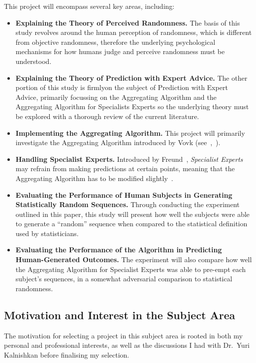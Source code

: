 This project will encompass several key areas, including:
\begin{itemize}
    \item \textbf{Explaining the Theory of Perceived Randomness.} The basis of this study revolves around the human perception of randomness, which is different from objective randomness, therefore the underlying psychological mechanisms for how humans judge and perceive randomness must be understood.
    \item \textbf{Explaining the Theory of Prediction with Expert Advice.} The other portion of this study is firmlyon the subject of Prediction with Expert Advice, primarily focussing on the Aggregating Algorithm and the Aggregating Algorithm for Specialists Experts so the underlying theory must be explored with a thorough review of the current literature.
    \item \textbf{Implementing the Aggregating Algorithm.} This project will primarily investigate the Aggregating Algorithm introduced by Vovk (see~\cite{vovk:1990},\ \cite{vovk:1998}).
    \item \textbf{Handling Specialist Experts.} Introduced by Freund~\cite{freund:1997}, \textit{Specialist Experts} may refrain from making predictions at certain points, meaning that the Aggregating Algorithm has to be modified slightly~\cite{kalnishkan:2015}.
    \item \textbf{Evaluating the Performance of Human Subjects in Generating Statistically Random Sequences.} Through conducting the experiment outlined in this paper, this study will present how well the subjects were able to generate a ``random'' sequence when compared to the statistical definition used by statisticians.
    \item \textbf{Evaluating the Performance of the Algorithm in Predicting Human-Generated Outcomes.} The experiment will also compare how well the Aggregating Algorithm for Specialist Experts was able to pre-empt each subject's sequences, in a somewhat adversarial comparison to statistical randomness.
\end{itemize}

\subsection{Motivation and Interest in the Subject Area}
The motivation for selecting a project in this subject area is rooted in both my personal and professional interests, as well as the discussions I had with Dr.\ Yuri Kalnishkan before finalising my selection.


